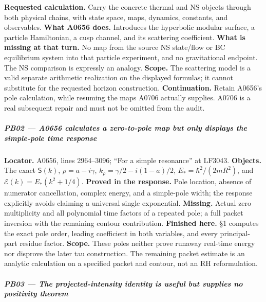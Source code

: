 \textbf{Requested calculation.} Carry the concrete thermal and NS
objects through both physical chains, with state space, maps, dynamics,
constants, and observables. \textbf{What A0656 does.} Introduces the
hyperbolic modular surface, a particle Hamiltonian, a cusp channel, and
its scattering coefficient. \textbf{What is missing at that turn.} No
map from the source NS state/flow or BC equilibrium system into that
particle experiment, and no gravitational endpoint. The NS comparison is
expressly an analogy. \textbf{Scope.} The scattering model is a valid
separate arithmetic realization on the displayed formulas; it cannot
substitute for the requested horizon construction.
\textbf{Continuation.} Retain A0656's pole calculation, while resuming
the maps A0706 actually supplies. A0706 is a real subsequent repair and
must not be omitted from the audit.

\subparagraph{PB02 --- A0656 calculates a zero-to-pole map but only
displays the simple-pole time
response}\label{pb02-a0656-calculates-a-zero-to-pole-map-but-only-displays-the-simple-pole-time-response}

\textbf{Locator.} A0656, lines 2964--3096; ``For a simple resonance'' at
LF3043. \textbf{Objects.} The exact \(\mathsf S(k)\),
\(\rho=a-i\gamma\), \(k_\rho=\gamma/2-i(1-a)/2\),
\(E_*=\hbar^2/(2mR^2)\), and \(\mathcal E(k)=E_*(k^2+1/4)\).
\textbf{Proved in the response.} Pole location, absence of numerator
cancellation, complex energy, and a simple-pole width; the response
explicitly avoids claiming a universal single exponential.
\textbf{Missing.} Actual zero multiplicity and all polynomial time
factors of a repeated pole; a full packet inversion with the remaining
contour contribution. \textbf{Finished here.}
\protect{} §1 computes the exact pole order, leading
coefficient in both variables, and every principal-part residue factor.
\textbf{Scope.} These poles neither prove runaway real-time energy nor
disprove the later tau construction. The remaining packet estimate is an
analytic calculation on a specified packet and contour, not an RH
reformulation.

\subparagraph{PB03 --- The projected-intensity identity is useful but
supplies no positivity
theorem}\label{pb03-the-projected-intensity-identity-is-useful-but-supplies-no-positivity-theorem}

